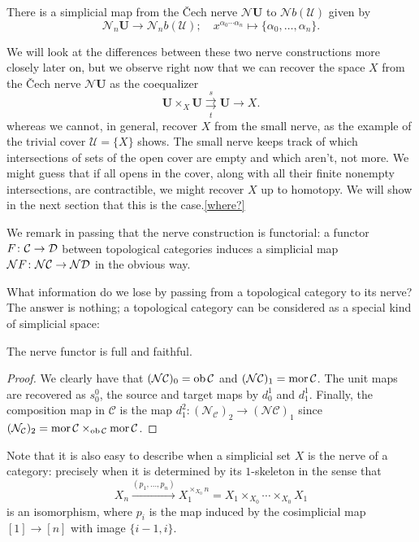 \documentclass[a4paper,openany]{scrbook}
\renewcommand{\C}{\mathcal C}
\newcommand{\nerve}{\mathcal N}
\begin{document}
There is a simplicial map from the \v Cech nerve $\nerve\mathbf U$ to $\nerve b(\mathcal U)$ given by
\[
\nerve_n\mathbf U \to \nerve_nb(\mathcal U); \quad x^{\alpha_0\cdots\alpha_n} \mapsto \{\alpha_0,\dots,\alpha_n\}.
\]

We will look at the differences between these two nerve constructions more closely later on, but we observe right now that we can recover the space $X$ from the \v Cech nerve $\nerve\mathbf U$ as the coequalizer
\[
\mathbf U \times_X \mathbf U \overset{s}{\underset{t}{\rightrightarrows}} \mathbf U \to X.
\]
whereas we cannot, in general, recover $X$ from the small nerve, as the example of the trivial cover $\mathcal U = \{X\}$ shows. The small nerve keeps track of which intersections of sets of the open cover are empty and which aren't, not more. We might guess that if all opens in the cover, along with all their finite nonempty intersections, are contractible, we might recover $X$ up to homotopy. We will show in the next section that this is the case.\ref{where?}

We remark in passing that the nerve construction is functorial: a functor $F\colon \C \to \D$ between topological categories induces a simplicial map $\nerve F\colon \nerve\C \to \nerve\D$ in the obvious way. 

What information do we lose by passing from a topological category to its nerve? The answer is nothing; a topological category can be considered as a special kind of simplicial space:

\begin{prop}\label{prop:nervefullyfaithful}
The nerve functor is full and faithful. 
\end{prop}
\begin{proof}
We clearly have that $(\nerve\C)_0 = \ob\C$ and $(\nerve\C)_1 = \mor\C$. The unit maps are recovered as $s^0_0$, the source and target maps by $d^1_0$ and $d^1_1$. Finally, the composition map in $\C$ is the map $d^2_1\colon (\nerve_\C)_2 \to (\nerve\C)_1$ since $(\nerve_\C)_2 = \mor\C \times_{\ob\C} \mor\C$.
\end{proof}

Note that it is also easy to describe when a simplicial set $X$ is the nerve of a category: precisely when it is determined by its $1$-skeleton in the sense that
\[
X_n \xrightarrow{(p_1,\dots,p_n)} X_1^{\times_{X_0} n} = X_1 \times_{X_0} \cdots \times_{X_0} X_1
\]
is an isomorphism, where $p_i$ is the map induced by the cosimplicial map $[1] \to [n]$ with image $\{i-1,i\}$.
\end{document}
